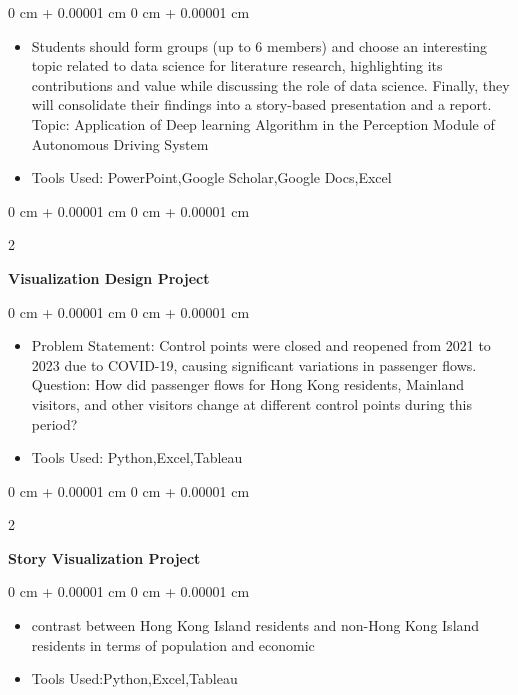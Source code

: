 \documentclass[10pt, letterpaper]{article}
\newenvironment{highlights}{
    \begin{itemize}[
        topsep=0.10 cm,
        parsep=0.10 cm,
        partopsep=0pt,
        itemsep=0pt,
        leftmargin=0 cm + 10pt
    ]
}{
    \end{itemize}
} %
\newenvironment{onecolentry}{
    \begin{adjustwidth}{
        0 cm + 0.00001 cm
    }{
        0 cm + 0.00001 cm
    }
}{
    \end{adjustwidth}
} %
\newenvironment{twocolentry}[2][]{
    \onecolentry
    \def\secondColumn{#2}
    \setcolumnwidth{\fill, 4.5 cm}
    \begin{paracol}{2}
}{
    \switchcolumn \raggedleft \secondColumn
    \end{paracol}
    \endonecolentry
} %
\begin{document}
        \vspace{0.10 cm}
        \begin{onecolentry}
            \begin{highlights}
                \item Students should form groups (up to 6 members) and choose an interesting topic related to data science for literature research, highlighting its contributions and value while discussing the role of data science. Finally, they will consolidate their findings into a story-based presentation and a report. Topic: Application of Deep learning Algorithm in the Perception Module of Autonomous Driving System
                \item Tools Used: PowerPoint,Google Scholar,Google Docs,Excel
            \end{highlights}
        \end{onecolentry}


        \vspace{0.2 cm}

        \begin{twocolentry}{
            
        }
            \textbf{Visualization Design Project}\end{twocolentry}

        \vspace{0.10 cm}
        \begin{onecolentry}
            \begin{highlights}
                \item Problem Statement: Control points were closed and reopened from 2021 to 2023 due to COVID-19, causing significant variations in passenger flows.
Question: How did passenger flows for Hong Kong residents, Mainland visitors, and other visitors change at different control points during this period?
                \item Tools Used: Python,Excel,Tableau
            \end{highlights}
        \end{onecolentry}


        \vspace{0.2 cm}

        \begin{twocolentry}{
           
        }
            \textbf{Story Visualization Project}\end{twocolentry}

        \vspace{0.10 cm}
        \begin{onecolentry}
            \begin{highlights}
                \item contrast between Hong Kong Island residents and non-Hong Kong Island residents in terms of population and economic

                \item Tools Used:Python,Excel,Tableau
            \end{highlights}
        \end{onecolentry}
\end{document}
